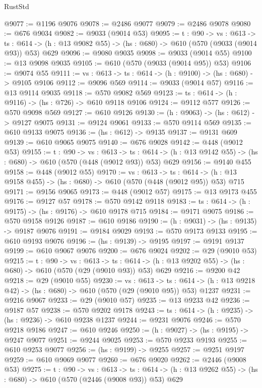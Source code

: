 \begin{lexlean}{RustStd}
\begin{coremodule}
@9077 := @1196 @9076
@9078 := @2486 @9077
@9079 := @2486 @9078
@9080 := @676 @9034
@9082 := @9033 (@9014 @53)
@9095 := {t : @90} ->
  {vs : @613} ->
  {ts : @614} -> (h : @13 @9082 @55) -> (hs : @680) -> @610 (@570 (@9033 (@9014 @93)) @53) @629
@9096 := @9080 @9035
@9098 := @9033 (@9014 @55)
@9100 := @13 @9098 @9035
@9105 := @610 (@570 (@9033 (@9014 @95)) @53)
@9106 := @9074 @55
@9111 := {vs : @613} -> {ts : @614} -> (h : @9100) -> (hs : @680) -> @9105 @9106
@9112 := @9096 @569
@9114 := @9033 (@9014 @57)
@9116 := @13 @9114 @9035
@9118 := @570 @9082 @569
@9123 := {ts : @614} -> (h : @9116) -> (hs : @726) -> @610 @9118 @9106
@9124 := @9112 @577
@9126 := @570 @9098 @569
@9127 := @610 @9126
@9130 := (h : @9063) -> (hs : @612) -> @9127 @9075
@9131 := @9124 @9061
@9133 := @570 @9114 @569
@9135 := @610 @9133 @9075
@9136 := (hs : @612) -> @9135
@9137 := @9131 @609
@9139 := @610 @9065 @9075
@9140 := @676 @9028
@9142 := @448 (@9012 @53)
@9155 := {t : @90} ->
  {vs : @613} ->
  {ts : @614} -> (h : @13 @9142 @55) -> (hs : @680) -> @610 (@570 (@448 (@9012 @93)) @53) @629
@9156 := @9140 @455
@9158 := @448 (@9012 @55)
@9170 := {vs : @613} ->
  {ts : @614} -> (h : @13 @9158 @455) -> (hs : @680) -> @610 (@570 (@448 (@9012 @95)) @53) @715
@9171 := @9156 @9065
@9173 := @448 (@9012 @57)
@9175 := @13 @9173 @455
@9176 := @9127 @57
@9178 := @570 @9142 @9118
@9183 := {ts : @614} -> (h : @9175) -> (hs : @9176) -> @610 @9178 @715
@9184 := @9171 @9075
@9186 := @570 @9158 @9126
@9187 := @610 @9186
@9190 := (h : @9031) -> (hs : @9135) -> @9187 @9076
@9191 := @9184 @9029
@9193 := @570 @9173 @9133
@9195 := @610 @9193 @9076
@9196 := (hs : @9139) -> @9195
@9197 := @9191 @9137
@9199 := @610 @9067 @9076
@9200 := @676 @9024
@9202 := @29 (@9010 @53)
@9215 := {t : @90} ->
  {vs : @613} ->
  {ts : @614} -> (h : @13 @9202 @55) -> (hs : @680) -> @610 (@570 (@29 (@9010 @93)) @53) @629
@9216 := @9200 @42
@9218 := @29 (@9010 @55)
@9230 := {vs : @613} ->
  {ts : @614} -> (h : @13 @9218 @42) -> (hs : @680) -> @610 (@570 (@29 (@9010 @95)) @53) @1237
@9231 := @9216 @9067
@9233 := @29 (@9010 @57)
@9235 := @13 @9233 @42
@9236 := @9187 @57
@9238 := @570 @9202 @9178
@9243 := {ts : @614} -> (h : @9235) -> (hs : @9236) -> @610 @9238 @1237
@9244 := @9231 @9076
@9246 := @570 @9218 @9186
@9247 := @610 @9246
@9250 := (h : @9027) -> (hs : @9195) -> @9247 @9077
@9251 := @9244 @9025
@9253 := @570 @9233 @9193
@9255 := @610 @9253 @9077
@9256 := (hs : @9199) -> @9255
@9257 := @9251 @9197
@9259 := @610 @9069 @9077
@9260 := @676 @9020
@9262 := @2446 (@9008 @53)
@9275 := {t : @90} ->
  {vs : @613} ->
  {ts : @614} -> (h : @13 @9262 @55) -> (hs : @680) -> @610 (@570 (@2446 (@9008 @93)) @53) @629

\end{coremodule}
\end{lexlean}
